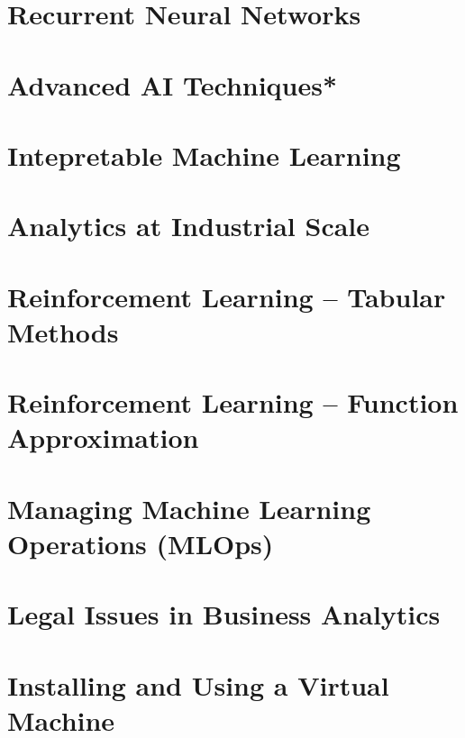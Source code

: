 \documentclass{book}
\begin{document}
\graphicspath{{class17/}}
\chapter{Recurrent Neural Networks}


\graphicspath{{class18/}}
\chapter{Advanced AI Techniques*}


\graphicspath{{class19/}}
\chapter{Intepretable Machine Learning}


\graphicspath{{class20/}}
\chapter{Analytics at Industrial Scale}


\graphicspath{{class21/}}
\chapter{Reinforcement Learning -- Tabular Methods}


\graphicspath{{class22/}}
\chapter{Reinforcement Learning -- Function Approximation}


\graphicspath{{class23/}}
\chapter{Managing Machine Learning Operations (MLOps)}


\graphicspath{{class24/}}
\chapter{Legal Issues in Business Analytics}


\appendix
\graphicspath{{vm/}}
\chapter{Installing and Using a Virtual Machine}


\backmatter

%

\printindex
\end{document}
